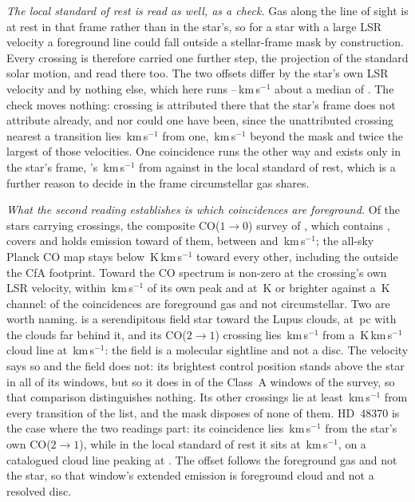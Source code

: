 \emph{The local standard of rest is read as well, as a check.} Gas along the
line of sight is at rest in that frame rather than in the star's, so for a
star with a large LSR velocity a foreground line could fall outside a
stellar-frame mask by construction. Every crossing is therefore carried one
further step, the projection of the standard solar motion, and read there
too. The two offsets differ by the star's own LSR velocity and by nothing
else, which here runs \LsVLsrLo--\LsVLsrHi\,km\,s$^{-1}$ about a median of
\LsVLsrMed. The check moves nothing: \LsNMoveWord{} crossing is attributed
there that the star's frame does not attribute already, and nor
could one have been, since the unattributed crossing nearest a transition lies
\LsNearestUnattr\,km\,s$^{-1}$ from one, \LsGapKms\,km\,s$^{-1}$ beyond the
mask and twice the largest of those velocities. One coincidence runs the
other way and exists only in the star's frame, \LsLeaveStar's
\LsLeaveDvStar\,km\,s$^{-1}$ from \LsLeaveLine{} against \LsLeaveDvLsr{} in
the local standard of rest, which is a further reason to decide in the frame
circumstellar gas shares.

\emph{What the second reading establishes is which coincidences are
foreground.} Of the \LsNLos{} stars carrying crossings, the composite
CO($1\to0$) survey of \citet{DameThaddeus2022}, which contains
\citet{Dame2001}, covers \LsNLosCov{} and holds emission toward \LsNLosDet{}
of them, between \LsCoVLo{} and \LsCoVHi\,km\,s$^{-1}$; the all-sky Planck CO
map \citep{PlanckCO2016} stays below \LsPlanckMax\,K\,km\,s$^{-1}$ toward
every other, including the \LsNLosOut{} outside the CfA footprint. Toward
\LsCloudStars{} the CO spectrum is non-zero at the crossing's own LSR
velocity, within \LsCloudDvMax\,km\,s$^{-1}$ of its own peak and at
\LsCloudTMin\,K or brighter against a \LsCoRms\,K channel: \LsNCloud{} of the
\MkNCoinc{} coincidences are foreground gas and not circumstellar.
Two are worth naming. \BkAlmaName{} is a serendipitous field star toward the
Lupus clouds, at \BkAlmaDistPc\,pc with the clouds far behind it, and its
CO($2\to1$) crossing lies \LsLupDv\,km\,s$^{-1}$ from a
\LsLupWco\,K\,km\,s$^{-1}$ cloud line at \LsLupVco\,km\,s$^{-1}$: the field
is a molecular sightline and not a disc. The velocity says so and the field
does not: its brightest control position stands above the star in all
\LsLupNRingLeadWord{} of its windows, but so it does in \LsRingLeadA{} of the
\NWinA{} Class~A windows of the survey, so that comparison
distinguishes nothing. Its other
\LsLupNFar{} crossings lie at least \LsLupFarMin\,km\,s$^{-1}$ from every
transition of the list, and the mask disposes of none of them. HD~48370 is
the case where the two readings part: its coincidence lies
\LsHdDvStar\,km\,s$^{-1}$ from the star's own CO($2\to1$), while in the local
standard of rest it sits at \LsHdVfeat\,km\,s$^{-1}$, on a catalogued cloud
line peaking at \LsHdVco. The offset follows the foreground gas and not the
star, so that window's extended emission is foreground cloud and not a
resolved disc.


